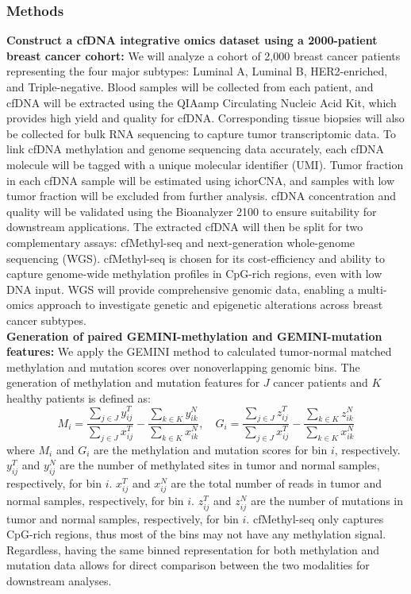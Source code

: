 \documentclass[11pt]{article}
\begin{document}
\subsubsection*{Methods}
\textbf{Construct a cfDNA integrative omics dataset using a 2000-patient breast cancer cohort:}
We will analyze a cohort of 2,000 breast cancer patients representing the four major subtypes: Luminal A, Luminal B, HER2-enriched, and Triple-negative.
Blood samples will be collected from each patient, and cfDNA will be extracted using the QIAamp Circulating Nucleic Acid Kit, which provides high yield and quality for cfDNA.
Corresponding tissue biopsies will also be collected for bulk RNA sequencing to capture tumor transcriptomic data.
To link cfDNA methylation and genome sequencing data accurately, each cfDNA molecule will be tagged with a unique molecular identifier (UMI).
Tumor fraction in each cfDNA sample will be estimated using ichorCNA, and samples with low tumor fraction will be excluded from further analysis.
cfDNA concentration and quality will be validated using the Bioanalyzer 2100 to ensure suitability for downstream applications.
The extracted cfDNA will then be split for two complementary assays: cfMethyl-seq and next-generation whole-genome sequencing (WGS). cfMethyl-seq is chosen for its cost-efficiency and ability to capture genome-wide methylation profiles in CpG-rich regions, even with low DNA input. WGS will provide comprehensive genomic data, enabling a multi-omics approach to investigate genetic and epigenetic alterations across breast cancer subtypes.
\medskip \\ 
\textbf{Generation of paired GEMINI-methylation and GEMINI-mutation features:}
We apply the GEMINI method to calculated tumor-normal matched methylation and mutation
scores over nonoverlapping genomic bins.
The generation of methylation and mutation features for $J$ cancer patients and $K$ healthy patients is defined as:
\begin{equation}
	M_{i} = \frac{\sum\limits_{j \in J}{y^{T}_{ij}}}{\sum\limits_{j \in J}{x^{T}_{ij}}} - 
	\frac{\sum\limits_{k \in K}{y^{N}_{ik}}}{\sum\limits_{k \in K}{x^{N}_{ik}}},
	\quad
	G_{i} = \frac{\sum\limits_{j \in J}{z^{T}_{ij}}}{\sum\limits_{j \in J}{x^{T}_{ij}}} - 
	\frac{\sum\limits_{k \in K}{z^{N}_{ik}}}{\sum\limits_{k \in K}{x^{N}_{ik}}}
\end{equation}
where $M_{i}$ and $G_{i}$ are the methylation and mutation scores for bin $i$, respectively. $y^{T}_{ij}$ and $y^{N}_{ij}$ are the number of methylated sites in tumor and normal samples, respectively, for bin $i$. $x^{T}_{ij}$ and $x^{N}_{ij}$ are the total number of reads in tumor and normal samples, respectively, for bin $i$. $z^{T}_{ij}$ and $z^{N}_{ij}$ are the number of mutations in tumor and normal samples, respectively, for bin $i$. cfMethyl-seq only captures CpG-rich regions, thus most of the bins 
may not have any methylation signal.
Regardless, having the same binned representation for both methylation and mutation data allows for direct comparison between the two modalities for downstream analyses.
\end{document}
